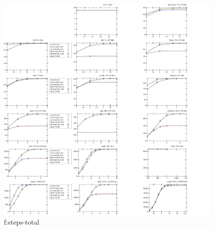 \begin{figure}[t]
  \includegraphics[width=\textwidth]{data/cdf-steps_prf_total.pdf}
  \caption{f:steps-total}
  \label{f:steps-total}
\end{figure}

\clearpage

